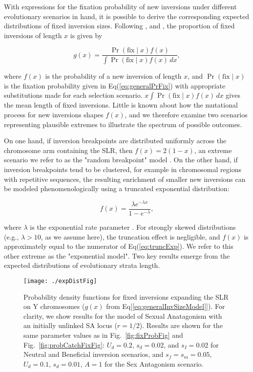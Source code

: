 \documentclass[11pt]{article}
\begin{document}
With expressions for the fixation probability of new inversions under different evolutionary scenarios in hand, it is possible to derive the corresponding expected distributions of fixed inversion sizes. Following \citet{vanValenLevins1968, Santos1986}, and \citet{ConnallonOlito2021}, the proportion of fixed inversions of length $x$ is given by 

\begin{equation} \label{eq:generalInvSizeModel}
	g(x) = \frac{\Pr(\text{fix} \mid x) f(x)} {\int \Pr(\text{fix} \mid x) f(x)\,dx},
\end{equation}

\noindent where $f(x)$ is the probability of a new inversion of length $x$, and $\Pr(\text{fix} \mid x)$ is the fixation probability given in Eq(\ref{eq:generalPrFix}) with appropriate substitutions made for each selection scenario. $x\int \Pr(\text{fix} \mid x) f(x)\,dx$ gives the mean length of fixed inversions. Little is known about how the mutational process for new inversions shapes $f(x)$, and we therefore examine two scenarios representing plausible extremes to illustrate the spectrum of possible outcomes.

On one hand, if inversion breakpoints are distributed uniformly across the chromosome arm containing the SLR, then $f(x) = 2(1 - x)$, an extreme scenario we refer to as the "random breakpoint" model \citep{vanValenLevins1968}. On the other hand, if inversion breakpoints tend to be clustered, for example in chromosomal regions with repetitive sequences, the resulting enrichment of smaller new inversions can be modeled phenomenologically using a truncated exponential distribution:

\begin{equation} \label{eq:truncExp}
	f(x) = \frac{ \lambda e^{-\lambda x}} {1 - e^{-\lambda}},
\end{equation}

\noindent where $\lambda$ is the exponential rate parameter \citep{PevznerTesler2003, PengPevznerTesler2006, ChengKirkpatrick2019,ConnallonOlito2021}. For strongly skewed distributions (e.g., $\lambda > 10$, as we assume here), the truncation effect is negligible, and $f(x)$ is approximately equal to the numerator of Eq(\ref{eq:truncExp}). We refer to this other extreme as the "exponential model". Two key results emerge from the expected distributions of evolutionary strata length.


 \begin{figure}[htbp]
 \centering
 \texttt{[image: ./expDistFig]}
 \caption{Probability density functions for fixed inversions expanding the SLR on Y chromosomes ($g(x)$ from Eq[\ref{eq:generalInvSizeModel}]). For clarity, we show results for the model of Sexual Anatagonism with an initially unlinked SA locus ($r = 1/2$). Results are shown for the same parameter values as in Fig.~\ref{fig:fixProbFig} and Fig.~\ref{fig:probCatchFixFig}: $U_d = 0.2$, $s_d = 0.02$, and $s_I = 0.02$ for Neutral and Beneficial inversion scenarios, and $s_f = s_m = 0.05$, $U_d = 0.1$, $s_d = 0.01$, $A = 1$ for the Sex Antagonism scenario.}
 \label{fig:ExpectedDistFig}
 \end{figure}
\end{document}
